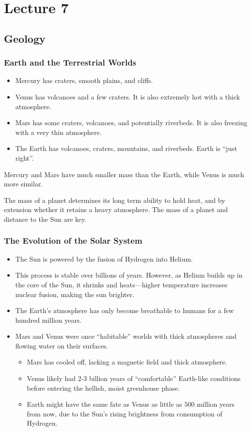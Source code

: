 \documentclass[class=article, crop=false]{standalone}
\begin{document}
  \section{Lecture 7}
  \subsection{Geology}
  \subsubsection{Earth and the Terrestrial Worlds}
  \begin{itemize}
    \item Mercury has craters, smooth plains, and cliffs.
    \item Venus has volcanoes and a few craters. It is also extremely hot with a thick atmosphere.
    \item Mars has some craters, volcanoes, and potentially riverbeds. It is also freezing with a very thin atmosphere.
    \item The Earth has volcanoes, craters, mountains, and riverbeds. Earth is ``just right''.
  \end{itemize}
  \begin{note}{}
    Mercury and Mars have much smaller mass than the Earth, while Venus is much more similar.
  \end{note}
  \begin{note}{}
    The mass of a planet determines its long term ability to hold heat, and by extension whether it retains a heavy atmosphere. The mass of a planet and distance to the Sun are key.
  \end{note}
  \subsubsection{The Evolution of the Solar System}
  \begin{itemize}
    \item The Sun is powered by the fusion of Hydrogen into Helium.
    \item This process is stable over billions of years. However, as Helium builds up in the core of the Sun, it shrinks and heats---higher temperature increases nuclear fusion, making the sun brighter.
    \item The Earth's atmosphere has only become breathable to humans for a few hundred million years.
    \item Mars and Venus were once ``habitable'' worlds with thick atmospheres and flowing water on their surfaces.
    \begin{itemize}
      \item Mars has cooled off, lacking a magnetic field and thick atmosphere.
      \item Venus likely had 2-3 billion years of ``comfortable'' Earth-like conditions before entering the hellish, moist greenhouse phase.
      \item Earth might have the same fate as Venus as little as $500$ million years from now, due to the Sun's rising brightness from consumption of Hydrogen.
    \end{itemize}
  \end{itemize}
\end{document}
